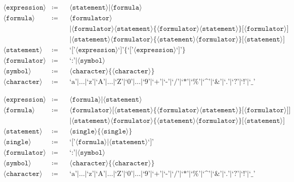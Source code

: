 \documentclass[british]{article}
\newcommand{\expression}{\langle\texttt{expression}\rangle}
\newcommand{\statement}{\langle\texttt{statement}\rangle}
\newcommand{\single}{\langle\texttt{single}\rangle}
\newcommand{\formula}{\langle\texttt{formula}\rangle}
\newcommand{\formulator}{\langle\texttt{formulator}\rangle}
\newcommand{\character}{\langle\texttt{character}\rangle}
\newcommand{\symb}{\langle\texttt{symbol}\rangle}
\begin{document}
\begin{align*}
\expression	& \coloneqq &&	\statement \Big| \formula\\
\formula	& \coloneqq &&	\formulator\\
			&           &&	\Big| \formulator \statement \Big\{ \formulator
							\statement \Big\} \Big[ \formulator \Big]\\
			&           &&	\Big| \statement \formulator \Big\{ \statement
							\formulator \Big\} \Big[ \statement \Big]\\
\statement	& \coloneqq &&  \textrm{`['} \expression \textrm{`]'} \Big\{
							\textrm{`['} \expression \textrm{`]'} \Big\}\\
\formulator & \coloneqq &&	\textrm{`:'} \Big| \symb\\
\symb		& \coloneqq &&  \character \Big\{ \character \Big\}\\
\character	& \coloneqq &&  \textrm{`a'} \Big| \dots \Big| \textrm{`z'} \Big|
							\textrm{`A'} \Big| \dots \Big| \textrm{`Z'} \Big|
							\textrm{`0'} \Big| \dots \Big| \textrm{`9'} \Big|
							\textrm{`+'} \Big| \textrm{`-'} \Big| \textrm{`/'}
							\Big| \textrm{`*'} \Big|\textrm{`\%'} \Big|
							\textrm{`\textasciicircum'} \Big| \textrm{`\&'}
							\Big| \textrm{`.'} \Big|\textrm{`?'} \Big|
							\textrm{`!'} \Big| \textrm{`\_'}
\end{align*}

\vspace{30pt}

\begin{align*}
\expression	& \coloneqq &&	\formula \Big| \statement\\
\formula	& \coloneqq &&	\formulator \bigg[ \statement \Big\{ \formulator
							\statement \Big\} \Big[ \formulator \Big] \bigg]\\
			&           &&	\Big| \statement \formulator \Big\{ \statement
							\formulator \Big\} \Big[ \statement \Big]\\
\statement	& \coloneqq &&  \single \Big\{ \single \Big\}\\
\single		& \coloneqq &&  \textrm{`['} \formula \Big| \statement \textrm{`]'}\\
\formulator & \coloneqq &&	\textrm{`:'} \Big| \symb\\
\symb		& \coloneqq &&  \character \Big\{ \character \Big\}\\
\character	& \coloneqq &&  \textrm{`a'} \Big| \dots \Big| \textrm{`z'} \Big|
							\textrm{`A'} \Big| \dots \Big| \textrm{`Z'} \Big|
							\textrm{`0'} \Big| \dots \Big| \textrm{`9'} \Big|
							\textrm{`+'} \Big| \textrm{`-'} \Big| \textrm{`/'}
							\Big| \textrm{`*'} \Big|\textrm{`\%'} \Big|
							\textrm{`\textasciicircum'} \Big| \textrm{`\&'}
							\Big| \textrm{`.'} \Big|\textrm{`?'} \Big|
							\textrm{`!'} \Big| \textrm{`\_'}
\end{align*}
\end{document}
